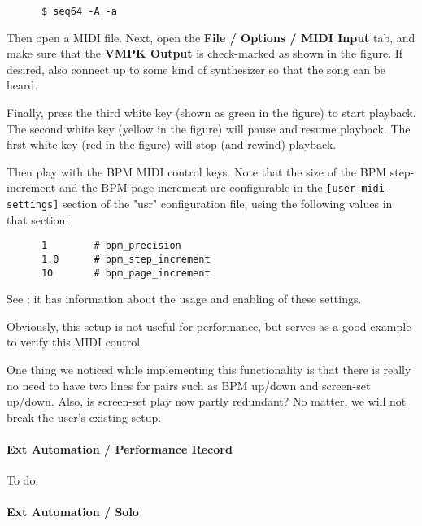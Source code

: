   \begin{verbatim}
      $ seq64 -A -a
   \end{verbatim}
   
   Then open a MIDI file.  Next,
   open the \textbf{File / Options / MIDI Input} tab, and make sure that
   the \textbf{VMPK Output} is check-marked as shown in the figure.
   If desired, also connect up to some kind of synthesizer so that the song can
   be heard.

   Finally, press the third white key (shown as green in the figure) to start
   playback.  The second white key (yellow in the figure) will pause and resume
   playback.  The first white key (red in the figure) will stop (and rewind)
   playback.

   Then play with the BPM MIDI control keys.  Note that the size of the
   BPM step-increment and the BPM page-increment are configurable in the
   \texttt{[user-midi-settings]} section of the "usr" configuration file,
   using the following values in that section:

   \begin{verbatim}
      1        # bpm_precision
      1.0      # bpm_step_increment
      10       # bpm_page_increment
   \end{verbatim}

   See ; it has
   information about the usage and enabling of these settings.

   Obviously, this setup is not useful for performance, but serves as a good
   example to verify this MIDI control.

   One thing we noticed while implementing this functionality is that there
   is really no need to have two lines for pairs such as BPM up/down and
   screen-set up/down.  Also, is screen-set play now partly redundant?
   No matter, we will not break the user's existing setup.

\paragraph{Ext Automation / Performance Record}
\label{paragraph:seq64_rc_file_midi_ctrl_ex_precord}

   To do.

\paragraph{Ext Automation / Solo}
\label{paragraph:seq64_rc_file_midi_ctrl_ex_solo}

